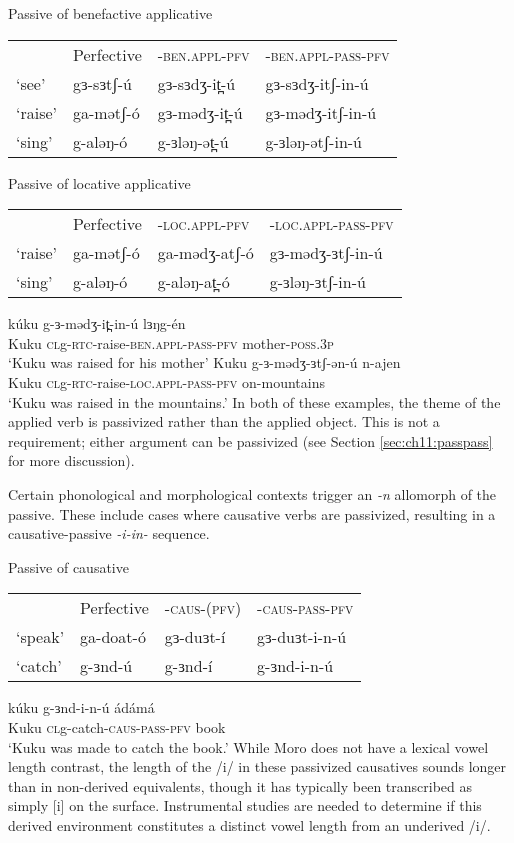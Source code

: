 \ea Passive of benefactive applicative
\begin{tabular}[t]{llll} %
& Perfective & -\textsc{ben.appl-pfv} 	& -\textsc{ben.appl-pass-pfv} \\
`see' 	& gɜ-sɜtʃ-ú 	& gɜ-sɜdʒ-it̪-ú 	& gɜ-sɜdʒ-itʃ-in-ú \\
`raise' & ga-mətʃ-ó 	& gɜ-mədʒ-it̪-ú 	& gɜ-mədʒ-itʃ-in-ú \\
`sing' 	& g-aləŋ-ó 		& g-ɜləŋ-ət̪-ú 	& g-ɜləŋ-ətʃ-in-ú \\
\end{tabular}
\ex Passive of locative applicative
\begin{tabular}[t]{llll}
& Perfective & -\textsc{loc.appl-pfv} & -\textsc{loc.appl-pass-pfv} \\
`raise' & ga-mətʃ-ó & ga-mədʒ-atʃ-ó & gɜ-mədʒ-ɜtʃ-in-ú \\
`sing' & g-aləŋ-ó & g-aləŋ-at̪-ó & g-ɜləŋ-ɜtʃ-in-ú\\
\end{tabular}
\ex 
\ea \gll kúku g-ɜ-mədʒ-it̪-in-ú lɜŋg-én \\
Kuku \textsc{cl}g-\textsc{rtc}-raise-\textsc{ben.appl-pass-pfv} mother-\textsc{poss.3p}\\
\glt `Kuku was raised for his mother'
\ex \gll Kuku g-ɜ-mədʒ-ɜtʃ-ən-ú n-ajen \\
Kuku \textsc{cl}g-\textsc{rtc}-raise-\textsc{loc.appl-pass-pfv} on-mountains\\
\glt `Kuku was raised in the mountains.'
\z 
\z
In both of these examples, the theme of the applied verb is passivized rather than the applied object. This is not a requirement; either argument can be passivized (see Section \ref{sec:ch11:passpass} for more discussion). 

Certain phonological and morphological contexts trigger an \textit{-n} allomorph of the passive. These include cases where causative verbs are passivized, resulting in a causative-passive \textit{-i-in-} sequence.

\ea Passive of causative\\
\begin{tabular}[t]{llll}
& Perfective & \textsc{-caus-(pfv)} & \textsc{-caus-pass-pfv}\\
‘speak’&  ga-doat-ó	& gɜ-duɜt-í & gɜ-duɜt-i-n-ú \\	
‘catch’ &  g-ɜnd-ú	& g-ɜnd-í & g-ɜnd-i-n-ú	\\
 \end{tabular}
\ex \gll kúku g-ɜnd-i-n-ú ádámá\\
Kuku \textsc{cl}g-catch-\textsc{caus-pass-pfv} book\\
\glt `Kuku was made to catch the book.'
\z
While Moro does not have a lexical vowel length contrast, the length of the /i/ in these passivized causatives sounds longer than in non-derived equivalents, though it has typically been transcribed as simply [i] on the surface. Instrumental studies are needed to determine if this derived environment constitutes a distinct vowel length from an underived /i/. 

